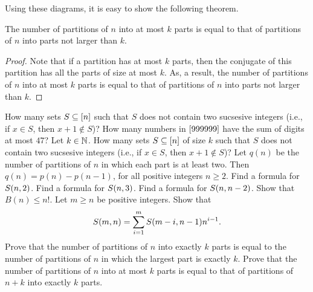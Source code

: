 Using these diagrams, it is easy to show the following theorem.
\begin{theorem}
  The number of partitions of $n$ into at most $k$ parts is equal to that of
  partitions of $n$ into parts not larger than $k$.
\end{theorem}
\begin{proof}
  Note that if a partition has at most $k$ parts, then the conjugate of this
  partition has all the parts of size at most $k$. As, a result, the number
  of partitions of $n$ into at most $k$ parts is equal to that of
  partitions of $n$ into parts not larger than $k$.
\end{proof}

\begin{chapterendexercises}
  \exercise How many sets $S \subseteq {[{n}]}$ such that $S$ does not contain
    two sucsesive integers (i.e., if $x \in S$, then $x + 1 \not\in S$)?
  \exercise How many numbers in ${[{999999}]}$ have the sum of digits at most $47$?
  \exercise Let $k \in {\mathbb{N}}$. How many sets $S \subseteq {[{n}]}$ of size $k$
    such that $S$ does not contain two sucsesive integers (i.e., if $x \in S$,
    then $x + 1 \not\in S$)?
  \exercise
    Let $q(n)$ be the number of partitions of $n$ in which each part is at least
    two. Then $q(n) = p(n) - p(n - 1)$, for all positive integers $n \ge 2$.
  \exercise[recommended] Find a formula for $S({n}, {2})$.
  \exercise Find a formula for $S({n}, {3})$.
  \exercise Find a formula for $S({n}, {n - 2})$.
  \exercise[recommended] Show that $B(n) \le n!$.
  \exercise Let $m \ge n$ be positive integers. Show that
    \[
      S({m}, {n}) = \sum_{i = 1}^m S({m - i}, {n - 1}) n^{i - 1}.
    \]
  \exercise Prove that the number of partitions of $n$ into exactly $k$
    parts is equal to the number of partitions of $n$ in which the
    largest part is exactly $k$.
  \exercise[recommended] Prove that the number of partitions of $n$ into at most $k$
    parts is equal to that of partitions of $n + k$ into exactly $k$ parts.
\end{chapterendexercises}
